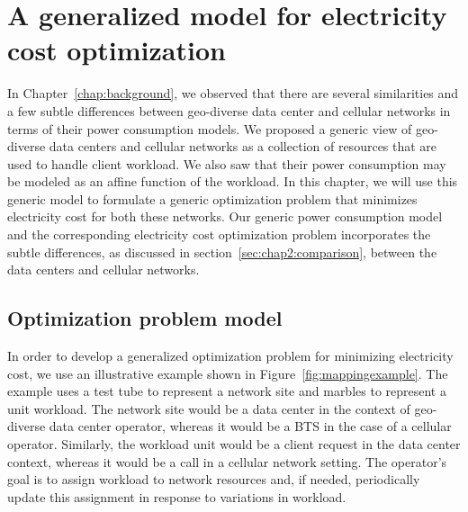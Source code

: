 \chapter{A generalized model for electricity cost optimization}
\label{chap:framework} In Chapter~\ref{chap:background}, we observed that there are several similarities and a few subtle differences between geo-diverse data center and cellular networks in terms of their power consumption models. We proposed a generic view of geo-diverse data centers and cellular networks as a collection of resources that are used to handle client workload. We also saw that their power consumption may be modeled as an affine function of the workload. In this chapter, we will use this generic model to formulate a generic optimization problem that minimizes electricity cost for both these networks. Our generic power consumption model and the corresponding electricity cost optimization problem incorporates the subtle differences, as discussed in section~\ref{sec:chap2:comparison}, between the data centers and cellular networks.


\section{Optimization problem model} %
In order to develop a generalized optimization problem for minimizing electricity cost, we use an illustrative example shown in Figure~\ref{fig:mappingexample}. The example uses a test tube to represent a network site and marbles to represent a unit workload. The network site would be a data center in the context of geo-diverse data center operator, whereas it would be a BTS in the case of a cellular operator. Similarly, the workload unit would be a client request in the data center context, whereas it would be a call in a cellular network setting. The operator's goal is to assign workload to network resources and, if needed, periodically update this assignment in response to variations in workload.

